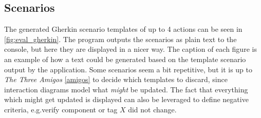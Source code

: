 \subsection{Scenarios}
The generated Gherkin scenario templates of up to 4 actions can be seen in \ref{fig:eval_gherkin}. The program outputs the scenarios as plain text to the console, but here they are displayed in a nicer way. The caption of each figure is an example of how a text could be generated based on the template scenario output by the application. Some scenarios seem a bit repetitive, but it is up to \textit{The Three Amigos} \ref{amigos} to decide which templates to discard, since interaction diagrams model what \textit{might} be updated. The fact that everything which might get updated is displayed can also be leveraged to define negative criteria, e.g.verify component or tag $X$ did not change.
